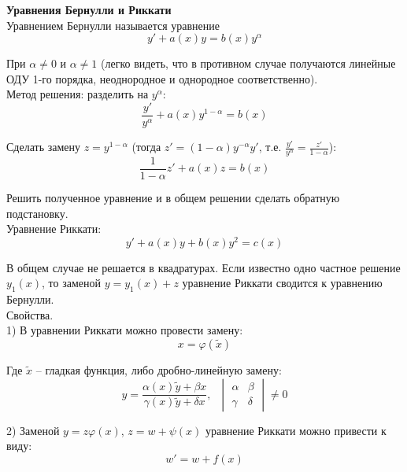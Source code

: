 \documentclass{article}
\begin{document}
	
	\textbf{Уравнения Бернулли и Риккати}\\

	Уравнением Бернулли называется уравнение
	\begin{equation}
		y' + a(x)y = b(x)y^\alpha
	\end{equation}

	При $\alpha\neq 0$ и $\alpha\neq 1$ (легко видеть, что в противном случае получаются линейные ОДУ 1-го порядка, неоднородное и однородное соответственно).\\

	Метод решения: разделить на $y^\alpha$:
	\begin{equation}
		\frac{y'}{y^\alpha} + a(x)y^{1-\alpha} = b(x)
	\end{equation}

	Сделать замену $z = y^{1-\alpha}$ (тогда $z'=(1-\alpha)y^{-\alpha}y'$, т.е. $\frac{y'}{y^\alpha}=\frac{z'}{1-\alpha}$):
	\begin{equation}
		\frac{1}{1-\alpha}z' + a(x)z = b(x)
	\end{equation}

	Решить полученное уравнение и в общем решении сделать обратную подстановку.\\

	Уравнение Риккати:
	\begin{equation}
		y' + a(x)y + b(x)y^2 = c(x)
	\end{equation}

	В общем случае не решается в квадратурах. Если известно одно частное решение $y_1(x)$, то заменой $y = y_1(x)+z$ уравнение Риккати сводится к уравнению Бернулли.\\

	Свойства.\\

	1) В уравнении Риккати можно провести замену:
	\begin{equation}
		x = \varphi(\widetilde x)
	\end{equation}

	Где $\widetilde x$ -- гладкая функция, либо дробно-линейную замену:
	\begin{equation}
		y = \frac{\alpha(x)\widetilde y + \beta x}{\gamma(x)\widetilde y + \delta x},\;\; \begin{vmatrix} \alpha & \beta \\ \gamma & \delta \end{vmatrix}\neq 0
	\end{equation}

	2) Заменой $y = z\varphi(x)$, $z = w + \psi(x)$ уравнение Риккати можно привести к виду:
	\begin{equation}
		w' = w + f(x)
	\end{equation}
\end{document}
